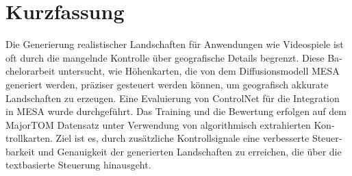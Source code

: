 \chapter{Kurzfassung}

\begin{german}
	Die Generierung realistischer Landschaften für Anwendungen wie Videospiele ist oft
	durch die mangelnde Kontrolle über geografische Details begrenzt. Diese Bachelorarbeit
	untersucht, wie Höhenkarten, die von dem Diffusionsmodell MESA generiert werden,
	präziser gesteuert werden können, um geografisch akkurate Landschaften zu erzeugen.
	Eine Evaluierung von ControlNet für die Integration in MESA wurde durchgeführt. Das Training und die Bewertung erfolgen auf dem MajorTOM Datensatz unter Verwendung von algorithmisch extrahierten Kontrollkarten. Ziel ist es, durch zusätzliche Kontrollsignale eine verbesserte Steuerbarkeit und Genauigkeit der
	generierten Landschaften zu erreichen, die über die textbasierte Steuerung hinausgeht.
\end{german}
